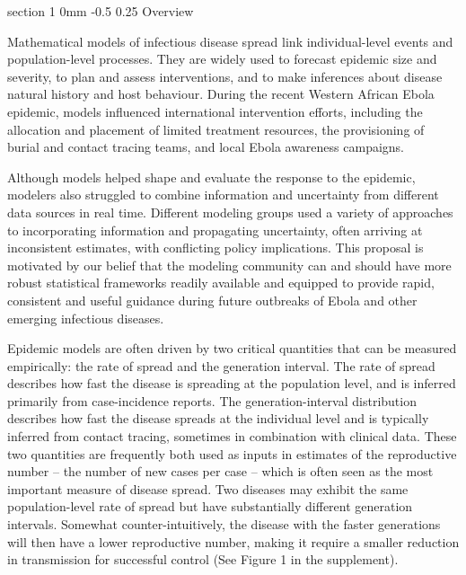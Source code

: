 \documentclass[12pt]{article}
\makeatletter
\renewcommand{\section}{\@startsection  %
{section}%
{1}%
{0mm}%
{-0.5\baselineskip}%
{0.25\baselineskip}%
{\normalfont\Large\bfseries}}%
\makeatother
\begin{document}
\newcommand{\sectitle}{Research Proposal}
\newcommand{\numpages}{10}
\newcommand{\proptitle}{Advancing real-time\\ outbreak analysis}

\section{Overview}

Mathematical models of infectious disease spread link individual-level events and population-level processes. They are widely used to forecast epidemic size and severity, to plan and assess interventions, and to make inferences about disease natural history and host behaviour. During the recent Western African Ebola epidemic, models influenced international intervention efforts, including the allocation and placement of limited treatment resources, the provisioning of burial and contact tracing teams, and local Ebola awareness campaigns.

Although models helped shape and evaluate the response to the epidemic, modelers also struggled to combine information and uncertainty from different data sources in real time. Different modeling groups used a variety of approaches to incorporating information and propagating uncertainty, often arriving at inconsistent estimates, with conflicting policy implications. This proposal is motivated by our belief that the modeling community can and should have more robust statistical frameworks readily available and equipped to provide rapid, consistent and useful guidance during future outbreaks of Ebola and other emerging infectious diseases.

Epidemic models are often driven by two critical quantities that can be measured empirically: the rate of spread and the generation interval. The rate of spread describes how fast the disease is spreading at the population level, and is inferred primarily from case-incidence reports. The generation-interval distribution describes how fast the disease spreads at the individual level and is typically inferred from contact tracing, sometimes in combination with clinical data.  These two quantities are frequently both used as inputs in estimates of the reproductive number -- the number of new cases per case -- which is often seen as the most important measure of disease spread. Two diseases may exhibit the same population-level rate of spread but have substantially different generation intervals. Somewhat counter-intuitively, the disease with the faster generations will then have a lower reproductive number, making it require a smaller reduction in transmission for successful control (See Figure 1 in the supplement).
\end{document}
